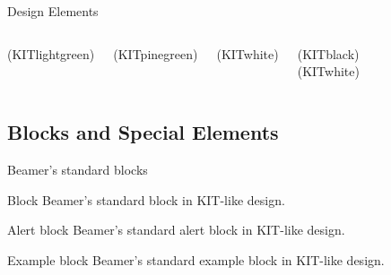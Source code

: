 \documentclass[
 UKenglish%
 ]{beamer}%
\begin{document}
\begin{frame}{Design Elements}
  \begin{columns}
    \column{0.48\hsize}\parskip\medskipamount
    \KITarrowE\quad
    \KITarrowS\quad
    \KITarrowW\quad
    \KITarrowN\qquad
    \KITarrowN[KITlightgreen]\par
    \KITarrowSE\quad
    \KITarrowSW\quad
    \KITarrowNW\quad
    \KITarrowNE\qquad
    \KITarrowNE(KITlightgreen)\par
    \KITcross\quad
    \KITplus\quad
    \KITminus\quad
    \KITequal\qquad
    \KITequal[KITred](KITpinegreen)\par
    \KITcheck\quad
    \quad
    \KITsymbol{$\int$}\quad
    \qquad
    \par
    \KITbook\quad
    \KITbulb\quad
    \KIThandshake\qquad
    \KIThandshake[KITyellow]\qquad
    \KIThandshake[KITgreen](KITwhite)\par
    \KITmeet\quad
    \KITmolecule\quad
    \KITteacher\qquad
    \KITteacher[KITyellow](KITblack)\qquad
    \KITteacher[KITdarkblue](KITwhite)
    \column{0.48\hsize}\parskip\medskipamount
    \textcolor{KITdarkblue}{\rule{0.5\hsize}{0.4bp}}\par
    \textcolor{KITgreen}{\rule[1ex]{0.5\hsize}{0.4bp}}\par
    \textcolor{KITiceblue}{\rule[1ex]{0.5\hsize}{0.4bp}}\par
    \textcolor{KITicegray}{\rule[1ex]{0.5\hsize}{0.4bp}}\par
    \textcolor{KITdarkblue}{\KITdashedrule{0.5\hsize}}\par
    \textcolor{KITgreen}{\KITdashedrule[1ex]{0.5\hsize}}\par
    \textcolor{KITiceblue}{\KITdashedrule[1ex]{0.5\hsize}}\par
    \textcolor{KITicegray}{\KITdashedrule[1ex]{0.5\hsize}}\par
    \KITlongarrow{0.5\hsize}\par
    \KITlongarrow[1ex]{0.5\hsize}\par
  \end{columns}
\end{frame}

\subsection{Blocks and Special Elements}

\begin{frame}{Beamer's standard blocks}
  \begin{block}{Block}
    Beamer's standard block in KIT-like design.
  \end{block}

  \begin{alertblock}{Alert block}
    Beamer's standard alert block in KIT-like design.
  \end{alertblock}

  \begin{exampleblock}{Example block}
    Beamer's standard example block in KIT-like design.
  \end{exampleblock}
\end{frame}
\end{document}
